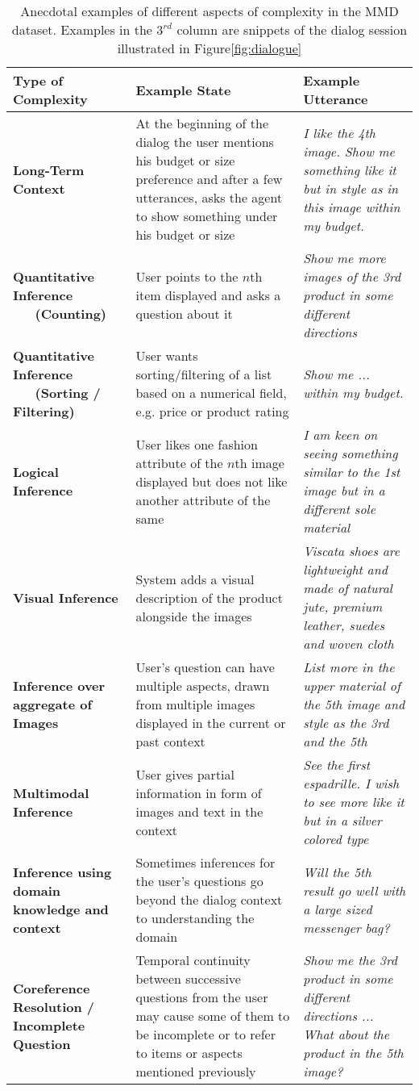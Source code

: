 \documentclass[letterpaper]{article} %
\begin{document}
\begin{table*}[ht]
{\tiny
\begin{center}
\begin{tabular}{|p{2.5cm}|p{8.2cm}|p{5.2cm}|}\hline
\textbf{Type of Complexity} & \textbf{Example State} & \textbf{Example Utterance} \\ \hline
\textbf{Long-Term Context} & At the beginning of the dialog the user mentions his budget or size preference and after a few utterances, asks the agent to show something under his budget or size & \textit{I like the 4th image. Show me something like it but in style as in this image within my budget.}\\\hline
\textbf{Quantitative Inference ~~~(Counting)} & User points to the $n$th item displayed and asks a question about it & \textit{Show me more images of the 3rd product in some different directions}\\\hline
\textbf{Quantitative Inference ~~~(Sorting / Filtering)} & User wants sorting/filtering of a list based on a numerical field, e.g. price or product rating & \textit{Show me ... within my budget.}\\\hline
\textbf{Logical Inference} & User likes one fashion attribute of the $n$th image displayed but does not like another attribute of the same & \textit{I am keen on seeing something similar to the 1st image but in a different sole material} \\\hline
\textbf{Visual Inference} & System adds a visual description of the product alongside the images & \textit{Viscata shoes are lightweight and made of natural jute, premium leather, suedes and woven cloth}\\\hline 
\textbf{Inference over aggregate of Images} & User's question can have multiple aspects, drawn from multiple images displayed in the current or past context & \textit{List more in the upper material of the 5th image and style as the 3rd and the 5th}\\\hline
\textbf{Multimodal Inference} & User gives partial information in form of images and text in the context & \textit{See the first espadrille. I wish to see more like it but in a silver colored type}\\\hline
\textbf{Inference using domain knowledge and context} & Sometimes inferences for the user's questions go beyond the dialog context to understanding the domain & \textit{Will the 5th result go well with a large sized messenger bag?}\\\hline
\textbf{Coreference Resolution / Incomplete Question} & Temporal continuity between successive questions from the user may cause some of them to be incomplete or to refer to items or aspects mentioned previously & \textit{Show me the 3rd product in some different directions ... What about the product in the 5th image?}\\\hline
\end{tabular}
\end{center}
}
\caption{Anecdotal examples of different aspects of complexity in the MMD dataset. Examples in the $3^{rd}$ column are snippets of the dialog session illustrated in Figure\ref{fig:dialogue}}
\end{table*}
\end{document}
